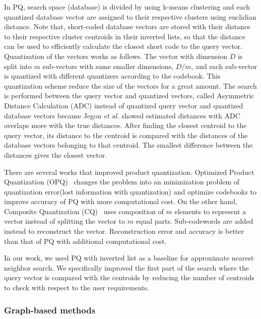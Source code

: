 In PQ, search space (database) is divided by using k-means clustering and each quantized database vector are assigned to their respective clusters using euclidian distance. 
Note that, short-coded database vectors are stored with their distance to their respective cluster centroids in their inverted lists, so that the distance can be used to efficiently calculate the closest short code to the query vector.
Quantization of the vectors works as follows.
The vector with dimension $D$ is split into $m$ sub-vectors with same smaller dimensions, $D/m$, and each sub-vector is quantized with different quantizers according to the codebook. 
This quantization scheme reduce the size of the vectors for a great amount.
The search is performed between the query vector and quantized vectors, called Asymmetric Distance Calculation (ADC) instead of quantized query vector and quantized database vectors because Jegou \emph{et al.} showed estimated distances with ADC overlaps more with the true distances.
After finding the closest centroid to the query vector, its distance to the centroid is compared with the distances of the database vectors belonging to that centroid. 
The smallest difference between the distances gives the closest vector.

There are several works that improved product quantization. Optimized Product Quantization (OPQ)~\cite{ge2013optimized} changes the problem into an minimization problem of quantization error(lost information with quantization) and optimize codebooks to improve accuracy of PQ with more computational cost. 
On the other hand, Composite Quantization (CQ)~\cite{wang2018composite} uses composition of $m$ elements to represent a vector instead of splitting the vector to $m$ equal parts. 
Sub-codewords are added instead to reconstruct the vector. 
Reconstruction error and accuracy is better than that of PQ with additional computational cost.

In our work, we used PQ with inverted list as a baseline for approximate nearest neighbor search. 
We specifically improved the first part of the search where the query vector is compared with the centroids by reducing the number of centroids to check with respect to the user requirements. 

\subsubsection*{Graph-based methods}

